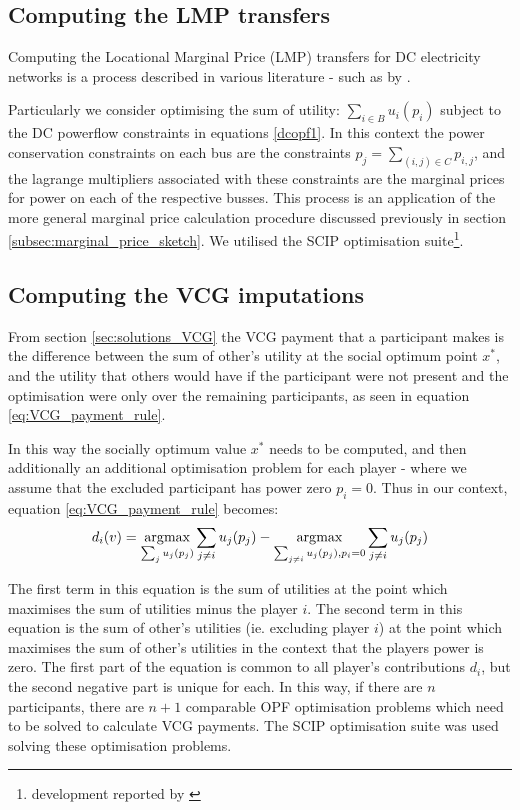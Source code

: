 \subsection{Computing the LMP transfers}\label{subsec:LMP_compute1}

Computing the Locational Marginal Price (LMP) transfers for DC electricity networks is a process described in various literature - such as by \cite{lmp1,lmp2}.

Particularly we consider optimising the sum of utility: $\sum_{i\in B} u_i(p_i)$ subject to the DC powerflow constraints in equations \ref{dcopf1}.
In this context the power conservation constraints on each bus are the constraints $p_j = \sum_{(i,j)\in C}p_{i,j}$, and the lagrange multipliers associated with these constraints are the marginal prices for power on each of the respective busses.
This process is an application of the more general marginal price calculation procedure discussed previously in section \ref{subsec:marginal_price_sketch}.
We utilised the SCIP optimisation suite\footnote{development reported by \cite{MaherFischerGallyetal.2017}}.

\subsection{Computing the VCG imputations}\label{subsec:VCG_compute1}

From section \ref{sec:solutions_VCG} the VCG payment that a participant makes is the difference between the sum of other's utility at the social optimum point $x^*$, and the utility that others would have if the participant were not present and the optimisation were only over the remaining participants, as seen in equation \ref{eq:VCG_payment_rule}.

In this way the socially optimum value $x^*$ needs to be computed, and then additionally an additional optimisation problem for each player - where we assume that the excluded participant has power zero $p_i=0$. Thus in our context, equation \ref{eq:VCG_payment_rule} becomes:
\begin{equation*} d_i(v)=\operatorname*{\arg\!\max}_{\sum_{j} u_j(p_j)}\sum_{j\ne i}u_j(p_j) - \operatorname*{\arg\!\max}_{\sum_{j\ne i} u_j(p_j), p_i=0}\sum_{j\ne i}u_j(p_j)\end{equation*}

The first term in this equation is the sum of utilities at the point which maximises the sum of utilities minus the player $i$.
The second term in this equation is the sum of other's utilities (ie. excluding player $i$) at the point which maximises the sum of other's utilities in the context that the players power is zero.
The first part of the equation is common to all player's contributions $d_i$, but the second negative part is unique for each.
In this way, if there are $n$ participants, there are $n+1$ comparable OPF optimisation problems which need to be solved to calculate VCG payments.
The SCIP optimisation suite was used solving these optimisation problems.


